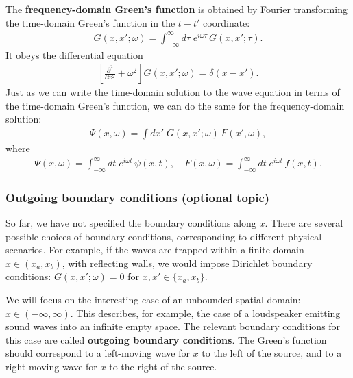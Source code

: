 \documentclass[10pt,a4paper]{article}
\begin{document}
The \textbf{frequency-domain Green's function} is obtained by Fourier
transforming the time-domain Green's function in the $t-t'$
coordinate:
\begin{align}
  G(x,x';\omega) = \int_{-\infty}^\infty d\tau\; e^{i\omega \tau}\, G(x,x'; \tau).
\end{align}
It obeys the differential equation
\begin{align}
  \left[\frac{\partial^2}{\partial x^2} + \omega^2 \right] G(x,x';\omega) = \delta(x-x').
\end{align}
Just as we can write the time-domain solution to the wave equation in
terms of the time-domain Green's function, we can do the same for the
frequency-domain solution:
\begin{align}
  \Psi(x,\omega) = \int dx' \; G(x,x';\omega) \, F(x', \omega),
\end{align}
where
\begin{align}
  \Psi(x,\omega) = \int_{-\infty}^\infty dt \; e^{i\omega t} \, \psi(x,t), \quad F(x,\omega) = \int_{-\infty}^\infty dt \; e^{i\omega t} \, f(x,t).
\end{align}

\subsubsection{Outgoing boundary conditions (optional topic)}
\label{outgoing-boundary-conditions}

So far, we have not specified the boundary conditions along $x$. There
are several possible choices of boundary conditions, corresponding to
different physical scenarios.  For example, if the waves are trapped
within a finite domain $x \in (x_a,x_b)$, with reflecting walls, we
would impose Dirichlet boundary conditions: $G(x,x';\omega) = 0$ for
$x,x' \in \{ x_a, x_b\}$.

We will focus on the interesting case of an unbounded spatial domain:
$x \in (-\infty, \infty)$. This describes, for example, the case of a
loudspeaker emitting sound waves into an infinite empty space. The
relevant boundary conditions for this case are called \textbf{outgoing
  boundary conditions}.  The Green's function should correspond to a
left-moving wave for $x$ to the left of the source, and to a
right-moving wave for $x$ to the right of the source.
\end{document}
